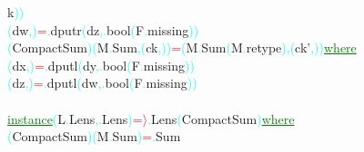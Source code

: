 {\rm{}k}\textcolor{cyan}{)}\textcolor{cyan}{)}\\\hstab \hstab \textcolor{cyan}{(}{\rm{}dw}\textcolor{cyan}{,}\textcolor{cyan}{)}\hsspace \textcolor{red}{=}\textcolor{cyan}{.}{\rm{}dputr}\hsspace \textcolor{cyan}{(}{\rm{}dz}\textcolor{cyan}{,}\textcolor{cyan}{.}{\rm{}bool}\hsspace \textcolor{cyan}{(}{\rm{}F}\textcolor{cyan}{.}{\rm{}missing}\textcolor{cyan}{)}\textcolor{cyan}{)}\\\hsspace \textcolor{cyan}{(}{\rm{}CompactSum}\textcolor{cyan}{)}\hsspace \textcolor{cyan}{(}{\rm{}M}\textcolor{cyan}{.}{\rm{}Sum}\textcolor{cyan}{,}\hsspace \textcolor{cyan}{(}{\rm{}ck}\textcolor{cyan}{,}\textcolor{cyan}{)}\textcolor{cyan}{)}\hsspace \textcolor{red}{=}\hsspace \textcolor{cyan}{(}{\rm{}M}\textcolor{cyan}{.}{\rm{}Sum}\hsspace \textcolor{cyan}{(}{\rm{}M}\textcolor{cyan}{.}{\rm{}retype}\textcolor{cyan}{)}\textcolor{cyan}{,}\hsspace \textcolor{cyan}{(}{\rm{}ck'}\textcolor{cyan}{,}\textcolor{cyan}{)}\textcolor{cyan}{)}\hsspace \textcolor{green}{\underline{where}}\\\hstab \hstab \textcolor{cyan}{(}{\rm{}dx}\textcolor{cyan}{,}\textcolor{cyan}{)}\hsspace \textcolor{red}{=}\textcolor{cyan}{.}{\rm{}dputl}\hsspace \textcolor{cyan}{(}{\rm{}dy}\textcolor{cyan}{,}\textcolor{cyan}{.}{\rm{}bool}\hsspace \textcolor{cyan}{(}{\rm{}F}\textcolor{cyan}{.}{\rm{}missing}\textcolor{cyan}{)}\textcolor{cyan}{)}\\\hstab \hstab \textcolor{cyan}{(}{\rm{}dz}\textcolor{cyan}{,}\textcolor{cyan}{)}\hsspace \textcolor{red}{=}\textcolor{cyan}{.}{\rm{}dputl}\hsspace \textcolor{cyan}{(}{\rm{}dw}\textcolor{cyan}{,}\textcolor{cyan}{.}{\rm{}bool}\hsspace \textcolor{cyan}{(}{\rm{}F}\textcolor{cyan}{.}{\rm{}missing}\textcolor{cyan}{)}\textcolor{cyan}{)}\\\\\textcolor{green}{\underline{instance}}\hsspace \textcolor{cyan}{(}{\rm{}L}\textcolor{cyan}{.}{\rm{}Lens}\textcolor{cyan}{,}\textcolor{cyan}{.}{\rm{}Lens}\textcolor{cyan}{)}\hsspace \textcolor{red}{=\ensuremath{\rangle}}\textcolor{cyan}{.}{\rm{}Lens}\hsspace \textcolor{cyan}{(}{\rm{}CompactSum}\textcolor{cyan}{)}\hsspace \textcolor{green}{\underline{where}}\\\hsspace \textcolor{cyan}{(}{\rm{}CompactSum}\textcolor{cyan}{)}\hsspace \textcolor{cyan}{(}{\rm{}M}\textcolor{cyan}{.}{\rm{}Sum}\textcolor{cyan}{)}\hsspace \textcolor{red}{=}\textcolor{cyan}{.}{\rm{}Sum}\hsspace 